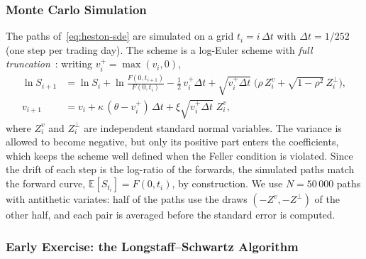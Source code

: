 \documentclass[11pt,a4paper]{article}
\theoremstyle{remark}
\newcommand{\E}{\mathbb{E}}
\begin{document}
\subsubsection{Monte Carlo Simulation}

The paths of~\eqref{eq:heston-sde} are simulated on a grid
$t_i = i\,\Delta t$ with $\Delta t = 1/252$ (one step per trading day). The
scheme is a log-Euler scheme with \emph{full truncation}~\cite{Lord2010}:
writing $v_i^+ = \max(v_i, 0)$,
\begin{equation}
\begin{aligned}
  \ln S_{i+1} &= \ln S_i + \ln\frac{F(0,t_{i+1})}{F(0,t_i)} - \tfrac{1}{2}\,v_i^+\Delta t
                 + \sqrt{v_i^+\Delta t}\;\bigl(\rho\,Z^v_i + \sqrt{1-\rho^2}\,Z^\perp_i\bigr), \\
  v_{i+1} &= v_i + \kappa\,(\theta - v_i^+)\,\Delta t + \xi\sqrt{v_i^+\Delta t}\;Z^v_i,
\end{aligned}
\label{eq:full-truncation}
\end{equation}
where $Z^v_i$ and $Z^\perp_i$ are independent standard normal variables. The
variance is allowed to become negative, but only its positive part enters the
coefficients, which keeps the scheme well defined when the Feller condition is
violated. Since the drift of each step is the log-ratio of the forwards, the
simulated paths match the forward curve, $\E[S_{t_i}] = F(0,t_i)$, by
construction. We use $N = 50\,000$ paths with antithetic variates: half of the
paths use the draws $(-Z^v, -Z^\perp)$ of the other half, and each pair is
averaged before the standard error is computed.

\subsubsection{Early Exercise: the Longstaff--Schwartz Algorithm}
\end{document}
